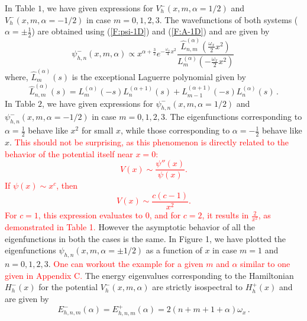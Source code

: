\documentclass[12pt]{article}
\numberwithin{equation}{section} %
\begin{document}
In Table $1$, we have given expressions for $V_{h}^{-}(x,m,\alpha = 1/2)$ and
$V_{h}^{-}(x,m,\alpha = -1/2)$ in case $m = 0,1,2,3$. 
The wavefunctions of both systems ($\alpha=\pm\frac{1}{2}$) are obtained using 
(\ref{F:psi-1D}) and (\ref{F:A-1D}) and are given by 
\begin{equation}\label{HLO:psi-}
\psi^-_{h,n}(x,m,\alpha)\propto x^{\alpha +\frac{3}{2}} e^{-\frac{\omega_x}{4}x^2}\frac{\hat{L}_{n,m}^{(\alpha)}(\frac{\omega_x}{2}x^2)}{L_m^{(\alpha) }\left(-\frac{\omega_x}{2}x^2  \right)}\,
\end{equation}
where, \( \hat{L}_{m}^{(\alpha)}(s) \) is the exceptional Laguerre polynomial 
given by
\begin{equation}
 \hat{L}_{n,m}^{(\alpha)}(s)=L_{m}^{(\alpha)}(-s) L_n^{(\alpha+1)}(s)+L_{m-1}^{(\alpha+1)}(-s) L_{n}^{(\alpha)}(s)\,.
\end{equation}
In Table $2$, we have given expressions for $\psi_{h,n}^{-}(x,m,\alpha = 1/2)$ and $\psi_{h,n}^{-}(x,m,\alpha = -1/2)$ in case $m = 0,1,2,3$. 
The eigenfunctions corresponding to \( \alpha = \frac{1}{2} \) behave like \( x^2 \) for small \( x \), while those corresponding to \( \alpha = -\frac{1}{2} \) behave like \( x \). \textcolor{red}{This should not be surprising, as this phenomenon is directly related to the behavior of the potential itself near \( x = 0 \):  
\[
V(x) \sim \frac{\psi''(x)}{\psi(x)}.
\]  
If \( \psi(x) \sim x^c \), then  
\[
V(x) \sim \frac{c(c-1)}{x^2}.
\]  
For \( c = 1 \), this expression evaluates to \( 0 \), and for \( c = 2 \), it results in \( \frac{2}{x^2} \), as demonstrated in Table 1.}
However the asymptotic behavior of all the eigenfunctions in both the cases is the same. In Figure 1, we have plotted the eigenfunctions $\psi_{h,n}(x,m,\alpha=\pm 1/2)$ as a 
function of $x$ in case $m = 1$ and $n = 0,1,2,3$. \textcolor{red}{One can workout the example for a given $m$ and $\alpha$ similar to one given in Appendix C.}  
The energy eigenvalues corresponding to the Hamiltonian $H_h^-(x)$ for the 
potential $V_h^-(x,m,\alpha)$ are strictly isospectral to $H_h^+(x)$ and are given by
\begin{equation}\label{HLO:E-}
E^-_{h,n,m}(\alpha)=E^+_{h,n,m}(\alpha)=2\left(n+m+1+\alpha\right)\omega_x\,.
\end{equation}
\end{document}
